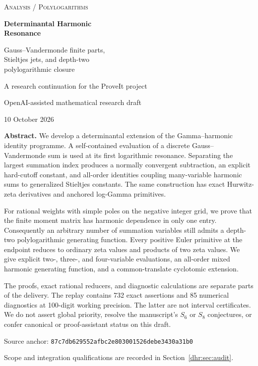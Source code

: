 \documentclass[11pt,letterpaper]{article}
\numberwithin{equation}{section}
\theoremstyle{definition}\newtheorem{definition}[theorem]{Definition}
\theoremstyle{remark}\newtheorem{remark}[theorem]{Remark}
\begin{document}
\begin{titlepage}
\centering
\vspace*{1.1cm}
{\small\scshape Analysis / Polylogarithms\par}
\vspace{1cm}
{\huge\bfseries\color{ink} Determinantal Harmonic\\[0.2em] Resonance\par}
\vspace{0.7cm}
{\Large Gauss--Vandermonde finite parts,\\[0.25em] Stieltjes jets, and depth-two\\[0.25em] polylogarithmic closure\par}
\vspace{1cm}
{\large A research continuation for the ProveIt project\par}
\vspace{0.25cm}
{OpenAI-assisted mathematical research draft\par}
{10 October 2026\par}
\vspace{1cm}
\begin{minipage}{0.91\textwidth}
\small
\textbf{Abstract.}
We develop a determinantal extension of the Gamma--harmonic identity
programme. A self-contained evaluation of a discrete Gauss--Vandermonde
sum is used at its first logarithmic resonance. Separating the largest
summation index produces a normally convergent subtraction, an explicit
hard-cutoff constant, and all-order identities coupling many-variable
harmonic sums to generalized Stieltjes constants. The same construction
has exact Hurwitz-zeta derivatives and anchored log-Gamma primitives.

For rational weights with simple poles on the negative integer grid,
we prove that the finite moment matrix has harmonic dependence in only
one entry. Consequently an arbitrary number of summation variables still
admits a depth-two polylogarithmic generating function. Every positive
Euler primitive at the endpoint reduces to ordinary zeta values and
products of two zeta values. We give explicit two-, three-, and four-variable
evaluations, an all-order mixed harmonic generating function, and a
common-translate cyclotomic extension.

The proofs, exact rational reducers, and diagnostic calculations are
separate parts of the delivery. The replay contains 732 exact assertions
and 85 numerical diagnostics at 100-digit working precision. The latter
are not interval certificates. We do not assert global priority, resolve
the manuscript's $S_6$ or $S_8$ conjectures, or confer canonical or
proof-assistant status on this draft.
\end{minipage}
\vfill
{\small Source anchor: \texttt{87c7db629552afbc2e803001526debe3430a31b0}\par}
{\small Scope and integration qualifications are recorded in Section~\ref{dhr:sec:audit}.\par}
\end{titlepage}
\end{document}
